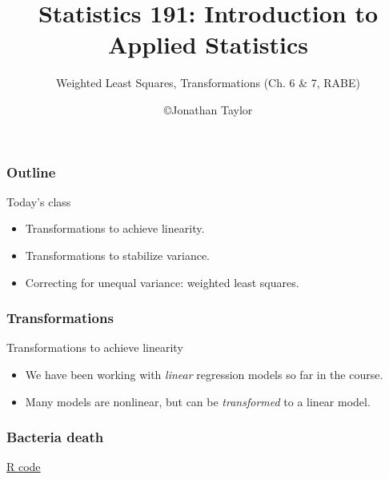 \documentclass[handout]{beamer}
\title{Statistics 191: Introduction to Applied Statistics}
\subtitle{Weighted Least Squares, Transformations (Ch. 6 \& 7, RABE)}
\author{\copyright Jonathan Taylor \\
   }
\begin{document}
   \begin{frame}
   \titlepage
   \end{frame}


   \begin{frame} \frametitle{Outline}

   \begin{block}{Today's class}

   \begin{itemize}

   \item Transformations to achieve linearity.

   \item Transformations to stabilize variance.
   \item Correcting for unequal variance: weighted least squares.
   \end{itemize}

   \end{block}
   \end{frame}


   \begin{frame} \frametitle{Transformations}

   \begin{block}
   {Transformations to achieve linearity                     }
   \begin{itemize}


   \item We have been working with {\em linear} regression models so far in the course.

   \item Many models are nonlinear, but can be {\em transformed} to a linear model.



   \end{itemize}

   \end{block}
   \end{frame}



   \begin{frame}
   \frametitle{Bacteria death}
   \begin{center}
   \end{center}
   \href{http://stats191.stanford.edu/transformations.html#bacteria-example}{R code}
   \end{frame}
\end{document}
